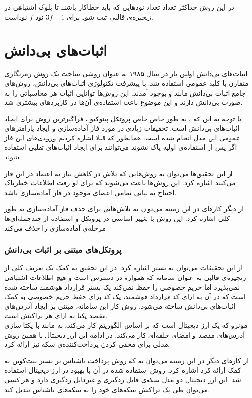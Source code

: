  \par
 در این روش حداکثر تعداد تعداد نود‌هایی که باید خطاکار باشند تا بلوک اشتباهی در زنجیره‌ی قالبی ثبت شود برای 
 $3f + 1$
 نود $f$ نود‌است.
 
\section{اثبات‌های بی‌دانش}
اثبات‌های بی‌دانش اولین بار در سال ۱۹۸۵ 
\cite{GHY}
به عنوان روشی ساخت یک روش رمزنگاری متقارن با کلید عمومی استفاده شد. با پیشرفت تکنولوژی اثبات‌های بی‌دانش،‌ روش‌های جامع اثبات بی‌دانش مانند
\cite{zksnark}
و  
\cite{zkstark}
بوجود آمدند. این روش‌ها توانایی اثبات هر محاسباتی را به صورت بی‌دانش دارند و این موضوع باعث استفاده‌ی آن‌ها در کاربردهای بیشتری شد.
\par
با توجه به این که 
، به طور خاص خاص پروتکل پینوکیو
،
فراگیرترین روش برای ایجاد اثبات‌های بی‌دانش است. تحقیقات زیادی در مورد فاز آماده‌سازی و ایجاد پارامترهای عمومی این مدل انجام شده است. همانطور که قبلا اشاره کردیم ورودی‌های این فاز اگر پس از استفاده‌ی اولیه پاک نشوند می‌توانند برای ایجاد اثبات‌های تقلبی استفاده شوند.
\par
از این تحقیق‌ها می‌توان به روش‌هایی
\cite{znsetup} \cite{multipartyparams}
که تلاش در کاهش نیاز به اعتماد در این فاز می‌کنند اشاره کرد. این روش‌ها باعث می‌شوند که برای لو رفت اطلاعات خطرناک احتیاج به تبانی تمامی اعضای موجود در فاز آماده‌سازی باشد.
\par
از دیگر کارهای در این زمینه می‌توان به تلاش‌هایی برای حذف فاز آماده‌سازی به طور کلی اشاره کرد. این روش‌ با تغییر اساسی در پروتکل و استفاده از چندجمله‌ای‌ها 
\cite{nosetup}
مرحله‌ي آماده‌سازی را حذف می‌کند
 
\subsubsection{پروتکل‌های مبتنی بر اثبات‌ بی‌دانش}
از این تحقیقات می‌توان به بستر 
\cite{hawk}
اشاره کرد. در این تحقیق به کمک یک تعریف کلی از زنجیره‌ی قالبی به عنوان سامانه که همواره در دسترس است و هیچ اطلاعات اشتباهی نمی‌پذیرد اما حریم خصوصی را حفظ نمی‌کند یک بستر قرارداد هوشمند ساخته شده است که در آن به ازای کد قرارداد هوشمند، یک کد برای حفظ حریم خصوصی به کمک اثبات‌های بی‌دانش ساخته می‌شود. روش کار این سامانه‌، مبتنی بر ایجاد آدرس‌های مقصد یکتا به ازای هر تراکنش است. 
\\
مونرو 
که یک ارز دیجیتال است که بر اساس الگوریتم 
\cite{monero}
کار می‌کند، به مانند 
با یکتا سازی آدرس‌های مقصد و امضای حلقه‌ای 
کار می‌کند. در ادامه این ارز دیجیتال با همین روش مدلی 
\cite{monero2}
برای مخفی کردن پرداخت‌کننده‌ی سکه نیز ارائه کرد.
\par
از کارهای دیگر در این زمینه‌ می‌توان به 
\cite{zerocoin}
که روش پرداخت ناشناس بر بستر بیت‌کوین به کمک 
ارائه کرد اشاره کرد. روش استفاده شده در آن با بهبود در ارز دیجیتال 
\cite{zerocash}
استفاده شد. این ارز دیجیتال دو مدل سکه‌ی قابل ردگیری و غیرقابل ردگیری دارد و هر کسی می‌توان طی یک تراکنش سکه‌های خود را به سکه‌های ناشناس تبدیل کند.



